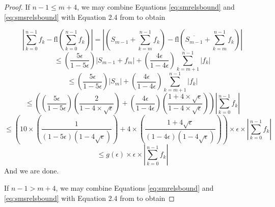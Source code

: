 \documentclass[12pt]{article}
\providecommand{\fl}{\ensuremath{\text{fl}}}
\theoremstyle{definition}
\numberwithin{equation}{section}
\begin{document}
\begin{proof}
      If $n - 1 \leq m + 4$, we may combine Equations \ref{eq:smrelsbound} and \ref{eq:smsrelsbound} with Equation 2.4 from \cite{higham} to obtain

      \begin{equation*}
        |\sum \limits_{k = 0}^{n - 1} f_k - \fl(\sum \limits_{k = 0}^{n - 1} f_k)| = |(S_{m - 1} + \sum \limits_{k = m}^{n - 1} f_k) - \fl(\overline{S_{m - 1}} + \sum \limits_{k = m}^{n - 1} f_k)|
      \end{equation*}
      \begin{equation*}
        \leq (\frac{5\epsilon}{1 - 5 \epsilon})|S_{m - 1} + f_m| + (\frac{4\epsilon}{1 - 4 \epsilon})\sum\limits_{k = m + 1}^{n - 1}|f_k|
      \end{equation*}
      \begin{equation*}
        \leq (\frac{5\epsilon}{1 - 5 \epsilon})|S_m| + (\frac{4\epsilon}{1 - 4 \epsilon})\sum\limits_{k = m + 1}^{n - 1}|f_k|
      \end{equation*}
      \begin{equation*}
 \leq ((\frac{5\epsilon}{1 - 5 \epsilon})(\frac{2}{1 - 4 \times \sqrt\epsilon}) + (\frac{4\epsilon}{1 - 4 \epsilon})(\frac{1 + 4 \times \sqrt\epsilon}{1 - 4 \times \sqrt\epsilon}))|\sum\limits_{k = 0}^{n - 1}f_k|
      \end{equation*}
      \begin{equation*}
 \leq (10 \times (\frac{1}{(1 - 5 \epsilon)(1 - 4 \sqrt\epsilon)}) + 4 \times (\frac{1 + 4 \sqrt \epsilon}{(1 - 4 \epsilon)(1 - 4 \sqrt\epsilon)}))\times \epsilon \times|\sum\limits_{k = 0}^{n - 1}f_k|
      \end{equation*}
      \begin{equation*}
        \leq g(\epsilon)\times \epsilon\times |\sum\limits_{k = 0}^{n - 1}f_k|
      \end{equation*}
      And we are done.

      If $n - 1 > m + 4$, we may combine Equations \ref{eq:smrelsbound} and \ref{eq:smsrelsbound} with Equation 2.4 from \cite{higham} to obtain


\end{proof}
\end{document}
